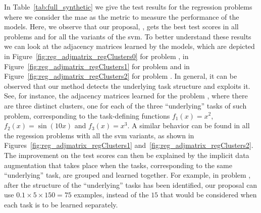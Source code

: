 %
In Table~\ref{tab:full_synthetic} we give the test results for the regression problems where we consider the \acrshort{mae} as the metric to measure the performance of the models.
%
Here, we observe that our proposal, , gets the best test scores in all problems and for all the variants of the \acrshort{svm}.
To better understand these results we can look at the adjacency matrices learned by the  models, which are depicted in Figure~\ref{fig:reg_adjmatrix_regClusters0} for problem , in Figure~\ref{fig:reg_adjmatrix_regClusters1} for problem  and in Figure~\ref{fig:reg_adjmatrix_regClusters2} for problem .
%
In general, it can be observed that our method detects the underlying task structure and exploits it.
See, for instance, the adjacency matrices learned for the problem , where there are three distinct clusters, one for each of the three ``underlying'' tasks of such problem, corresponding to the task-defining functions $f_1(x) = x^2$,  $f_2(x) = \sin(10x)$ and $f_3(x) = x^3$.
%
A similar behavior can be found in all the regession problems with all the \acrshort{svm} variants, as shown in Figures~\ref{fig:reg_adjmatrix_regClusters1} and~\ref{fig:reg_adjmatrix_regClusters2}.
%
The improvement on the test scores can then be explained by the implicit data augmentation that takes place when the tasks, corresponding to the same ``underlying'' task, are grouped and learned together.
%
For example, in problem , after the structure of the ``underlying'' tasks has been identified, our proposal can use $0.1 \times 5 \times 150 = 75$ examples, instead of the $15$ that would be considered when each task is to be learned separately.
%

